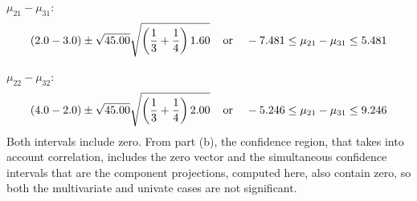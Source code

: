 \begin{enumerate}[label= (\alph*)]
    $\mu_{21} - \mu_{31}$:
    \[
        (2.0 - 3.0)
        \pm
        \sqrt{45.00}
        \sqrt{
            \left(
                \frac{1}{3}
                +
                \frac{1}{4}
            \right)
            1.60
        }
        \hspace{0.4cm}\text{or}\hspace{0.4cm}
        -7.481 \leq \mu_{21} - \mu_{31} \leq 5.481
    \]

    $\mu_{22} - \mu_{32}$:
    \[
        (4.0 - 2.0)
        \pm
        \sqrt{45.00}
        \sqrt{
            \left(
                \frac{1}{3}
                +
                \frac{1}{4}
            \right)
            2.00
        }
        \hspace{0.4cm}\text{or}\hspace{0.4cm}
        -5.246 \leq \mu_{21} - \mu_{31} \leq 9.246
    \]
    Both intervals include zero. From part (b), the confidence region, that takes into account correlation, includes the zero vector and the simultaneous confidence intervals that are the component projections, computed here, also contain zero, so both the multivariate and univate cases are not significant.
\end{enumerate}